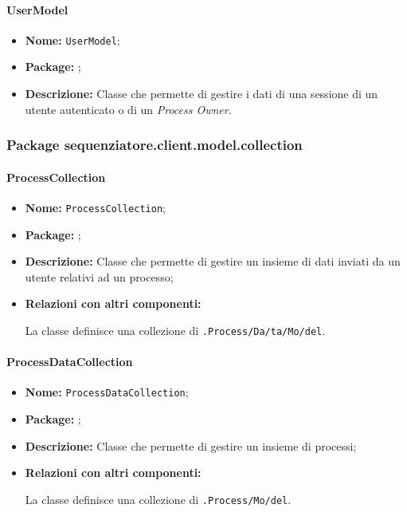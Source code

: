 \paragraph{UserModel}
\begin{flushleft}
\begin{itemize}
\item \textbf{Nome:} \texttt{UserModel};
\item \textbf{Package:} \texttt{\model{}};
\item \textbf{Descrizione:} Classe che permette di gestire i dati di una sessione di un utente autenticato o di un \textit{Process Owner}.
\end{itemize}
\end{flushleft}

\subsubsection{Package sequenziatore.client.model.collection}

\paragraph{ProcessCollection}
\begin{flushleft}
\begin{itemize}
\item \textbf{Nome:} \texttt{ProcessCollection};
\item \textbf{Package:} \texttt{\collection{}};
\item \textbf{Descrizione:} Classe che permette di gestire un insieme di dati inviati da un utente relativi ad un processo;
\item \textbf{Relazioni con altri componenti:}
\begin{sloppypar}
La classe definisce una collezione di \texttt{\collection{}.Process\fshyp{}Da\fshyp{}ta\fshyp{}Mo\fshyp{}del}.
\end{sloppypar}
\end{itemize}
\end{flushleft}

\paragraph{ProcessDataCollection}
\begin{flushleft}
\begin{itemize}
\item \textbf{Nome:} \texttt{ProcessDataCollection};
\item \textbf{Package:} \texttt{\collection{}};
\item \textbf{Descrizione:} Classe che permette di gestire un insieme di processi;
\item \textbf{Relazioni con altri componenti:}
\begin{sloppypar}
La classe definisce una collezione di \texttt{\collection{}.Process\fshyp{}Mo\fshyp{}del}.
\end{sloppypar}
\end{itemize}
\end{flushleft}

